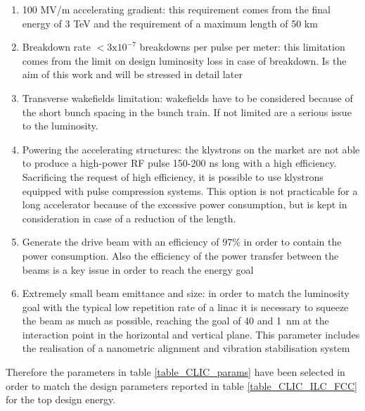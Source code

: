 \begin{enumerate}
\item 100 MV/m accelerating gradient: this requirement comes from the final energy of 3 TeV and the requirement of a maximum length of 50 km
\item Breakdown rate $< 3\text{x}10^{-7}$ breakdowns per pulse per meter: this limitation comes from the limit on design luminosity loss in case of breakdown. Is the aim of this work and will be stressed in detail later
\item Transverse wakefields limitation: wakefields have to be considered because of the short bunch spacing in the bunch train. If not limited are a serious issue to the luminosity.
\item Powering the accelerating structures: the klystrons on the market are not able to produce a high-power RF pulse 150-200 ns long with a high efficiency. Sacrificing the request of high efficiency, it is possible to use klystrons equipped with pulse compression systems. This option is not practicable for a long accelerator because of the excessive power consumption, but is kept in consideration in case of a reduction of the length.
\item Generate the drive beam with an efficiency of $97 \%$ in order to contain the power consumption. Also the efficiency of the power transfer between the beams is a key issue in order to reach the energy goal
\item Extremely small beam emittance and size: in order to match the luminosity goal with the typical low repetition rate of a linac it is necessary to squeeze the beam as much as possible, reaching the goal of 40 and 1~nm at the interaction point in the horizontal and vertical plane. This parameter includes the realisation of a nanometric alignment and vibration stabilisation system 
\end{enumerate}





Therefore the parameters in table \ref{table_CLIC_params} have been selected in order to match the design parameters reported in table \ref{table_CLIC_ILC_FCC} for the top design energy.


